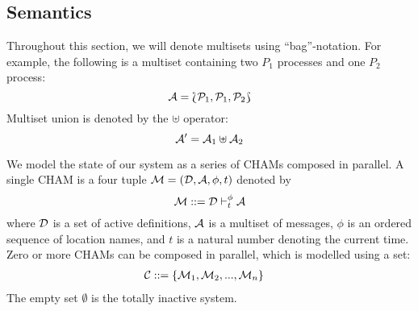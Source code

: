 \subsection{Semantics}
Throughout this section, we will denote multisets using ``bag''-notation. For
example, the following is a multiset containing two $P_1$ processes and one
$P_2$ process:
\begin{equation*}
 \mathcal{A} = \Lbag \mathcal{P}_1, \mathcal{P}_1, \mathcal{P}_2 \Rbag
\end{equation*}
Multiset union is denoted by the $\uplus$ operator:
\begin{equation*}
 \mathcal{A}' = \mathcal{A}_1 \uplus \mathcal{A}_2
\end{equation*}

We model the state of our system as a series of CHAMs composed in parallel. A
single CHAM is a four tuple $\mathcal{M} = (\mathcal{D}, \mathcal{A}, \phi, t)$ denoted by
\begin{equation*}
 \mathcal{M} ::= \mathcal{D} \vdash_{t}^{\phi} \mathcal{A}
\end{equation*}
where $\mathcal{D}$ is a set of active definitions, $\mathcal{A}$ is a multiset of messages,
$\phi$ is an ordered sequence of location names, and $t$ is a natural number
denoting the current time. Zero or more CHAMs can be composed in parallel, which
is modelled using a set:
\begin{align*}
 \mathcal{C} ::={}& \{ \mathcal{M}_1, \mathcal{M}_2, ..., \mathcal{M}_n \}
\end{align*}
The empty set $\emptyset$ is the totally inactive system.

